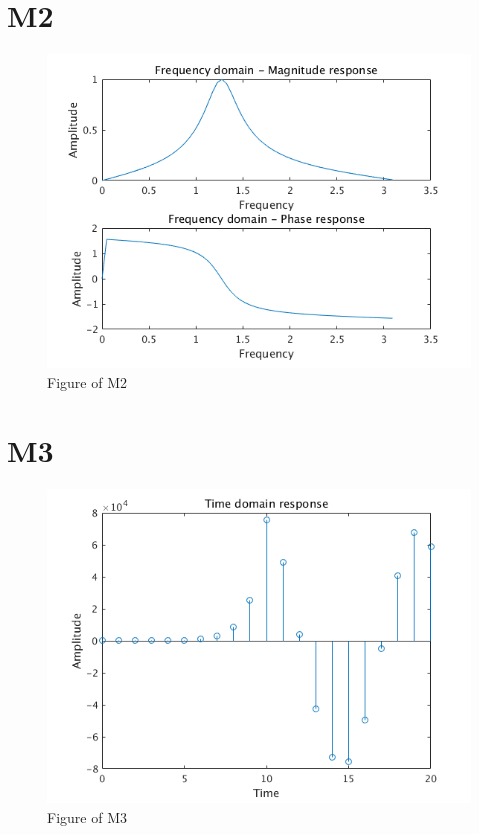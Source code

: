 \documentclass[11pt,a4paper,twoside]{article}
\begin{document}
\section{M2}

\begin{figure}[H]
\centering
\includegraphics[width=0.8\linewidth]{img/m2}
\caption{Figure of M2}
\label{Figure of M2}
\end{figure}


\section{M3}

\begin{figure}[H]
\centering
\includegraphics[width=0.8\linewidth]{img/m3}
\caption{Figure of M3}
\label{Figure of M3}
\end{figure}
\end{document}

